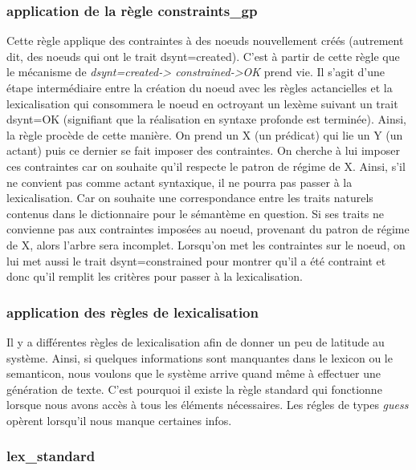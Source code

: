 \subsubsection{application de la règle constraints{\_}gp}
Cette règle applique des contraintes à des noeuds nouvellement créés (autrement dit, des noeuds qui ont le trait dsynt=created). C'est à partir de cette règle que le mécanisme de \emph{dsynt=created-> constrained->OK} prend vie. Il s'agit d'une étape intermédiaire entre la création du noeud avec les règles actancielles et la lexicalisation qui consommera le noeud en octroyant un lexème suivant un trait dsynt=OK (signifiant que la réalisation en syntaxe profonde est terminée). Ainsi, la règle procède de cette manière. On prend un X (un prédicat) qui lie un Y (un actant) puis ce dernier se fait imposer des contraintes. On cherche à lui imposer ces contraintes car on souhaite qu'il respecte le patron de régime de X. Ainsi, s'il ne convient pas comme actant syntaxique, il ne pourra pas passer à la lexicalisation. Car on souhaite une correspondance entre les traits naturels contenus dans le dictionnaire pour le sémantème en question. Si ses traits ne convienne pas aux contraintes imposées au noeud, provenant du patron de régime de X, alors l'arbre sera incomplet. Lorsqu'on met les contraintes sur le noeud, on lui met aussi le trait dsynt=constrained pour montrer qu'il a été contraint et donc qu'il remplit les critères pour passer à la lexicalisation.

\subsubsection{application des règles de lexicalisation}

Il y a différentes règles de lexicalisation afin de donner un peu de latitude au système. Ainsi, si quelques informations sont manquantes dans le lexicon ou le semanticon, nous voulons que le système arrive quand même à effectuer une génération de texte. C'est pourquoi il existe la règle standard qui fonctionne lorsque nous avons accès à tous les éléments nécessaires. Les régles de types \emph{guess} opèrent lorsqu'il nous manque certaines infos. 

\subsubsection{lex{\_}standard}

